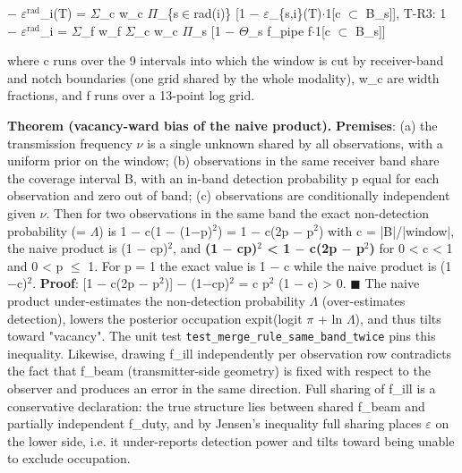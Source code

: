 \documentclass[11pt]{article}
\begin{document}
 \(-\) \(\varepsilon\)\(^{\mathrm{rad}}\)\_i(T) = \(\Sigma\)\_c w\_c \(\Pi\)\_\{s\(\in\)rad(i)\} [1 \(-\) \(\varepsilon\)\_\{s,i\}(T)\(\cdot\)1[c \(\subset\) B\_s]],  T-R3: 1 \(-\) \(\varepsilon\)\(^{\mathrm{rad}}\)\_i = \(\Sigma\)\_f w\_f \(\Sigma\)\_c w\_c \(\Pi\)\_s [1 \(-\) \(\Theta\)\_s f\_pipe f\(\cdot\)1[c \(\subset\) B\_s]]\par\smallskip

\noindent where c runs over the 9 intervals into which the window is cut by receiver-band and notch boundaries (one grid shared by the whole modality), w\_c are width fractions, and f runs over a 13-point log grid.\par\smallskip

\noindent \textbf{Theorem (vacancy-ward bias of the naive product).} \textbf{Premises}: (a) the transmission frequency \(\nu\) is a single unknown shared by all observations, with a uniform prior on the window; (b) observations in the same receiver band share the coverage interval B, with an in-band detection probability p equal for each observation and zero out of band; (c) observations are conditionally independent given \(\nu\). Then for two observations in the same band the exact non-detection probability (= \(\Lambda\)) is 1 \(-\) c(1 \(-\) (1\(-\)p)\(^{2}\)) = 1 \(-\) c(2p \(-\) p\(^{2}\)) with c = |B|/|window|, the naive product is (1 \(-\) cp)\(^{2}\), and \textbf{(1 \(-\) cp)\(^{2}\) < 1 \(-\) c(2p \(-\) p\(^{2}\))} for 0 < c < 1 and 0 < p \(\leq\) 1. For p = 1 the exact value is 1 \(-\) c while the naive product is (1\(-\)c)\(^{2}\). \textbf{Proof}: [1 \(-\) c(2p \(-\) p\(^{2}\))] \(-\) (1\(-\)cp)\(^{2}\) = c p\(^{2}\) (1 \(-\) c) > 0. \(\blacksquare\) The naive product under-estimates the non-detection probability \(\Lambda\) (over-estimates detection), lowers the posterior occupation expit(logit \(\pi\) + ln \(\Lambda\)), and thus tilts toward "vacancy". The unit test \texttt{test\_merge\_rule\_same\_band\_twice} pins this inequality. Likewise, drawing f\_ill independently per observation row contradicts the fact that f\_beam (transmitter-side geometry) is fixed with respect to the observer and produces an error in the same direction. Full sharing of f\_ill is a conservative declaration: the true structure lies between shared f\_beam and partially independent f\_duty, and by Jensen's inequality full sharing places \(\varepsilon\) on the lower side, i.e. it under-reports detection power and tilts toward being unable to exclude occupation.\par\smallskip
\end{document}
